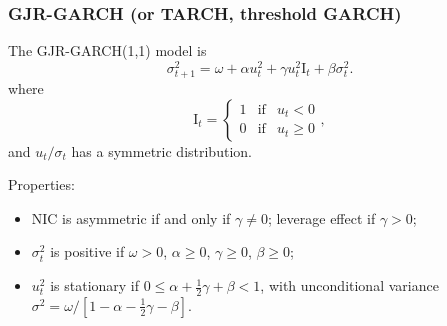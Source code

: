\begin{frame}%

\frametitle{GJR-GARCH (or TARCH, threshold GARCH)}

The GJR-GARCH(1,1) model is%
\begin{equation*}
\sigma _{t+1}^{2}=\omega +\alpha u_{t}^{2}+\gamma u_{t}^{2}\text{I}%
_{t}+\beta \sigma _{t}^{2}.
\end{equation*}%
where%
\begin{equation*}
\text{I}_{t}=\left\{
\begin{array}{ccc}
1 & \text{if} & u_{t}<0 \\
0 & \text{if} & u_{t}\geq 0%
\end{array}%
\right. ,
\end{equation*}%
and $u_{t}/\sigma_{t}$ has a symmetric distribution.

Properties:

\begin{itemize}
\item NIC is asymmetric if and only if $\gamma \neq 0$; leverage effect if $%
\gamma >0$;

\item $\sigma _{t}^{2}$ is positive if $\omega >0$, $\alpha \geq 0$, $\gamma
\geq 0$, $\beta \geq 0$;

\item $u_{t}^{2}$ is stationary if $0\leq \alpha +\frac{1}{2}\gamma +\beta
<1 $, with unconditional variance $\sigma ^{2}=\omega /\left[ 1-\alpha -%
\frac{1}{2}\gamma -\beta \right] $.
\end{itemize}

\end{frame}%

